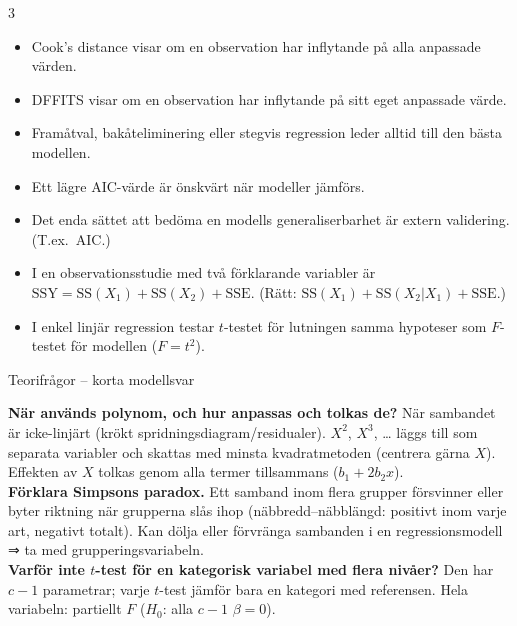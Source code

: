\documentclass[8pt]{extarticle}
\makeatletter
\newcounter{sect}
\newcommand{\sect}[3][hd]{\par\vspace{1.5pt}\refstepcounter{sect}\noindent
  {\setlength{\fboxsep}{1.8pt}\colorbox{#1}{\parbox{\dimexpr\linewidth-2\fboxsep}{\color{white}\sffamily\bfseries
  \strut\thesect\enspace #2}}}\label{#3}\par\nobreak\vspace{0.8pt}\@afterheading}
\newcommand{\sant}{\textcolor{OliveGreen}{\sffamily\bfseries S}}
\newcommand{\falskt}{\textcolor{BrickRed}{\sffamily\bfseries F}}
\newcommand{\SSE}{\mathrm{SSE}}
\newcommand{\SSY}{\mathrm{SSY}}
\newcommand{\SSq}{\mathrm{SS}}
\makeatother
\begin{document}
\begin{multicols*}{3}
{\begin{itemize}[leftmargin=7pt,labelsep=2pt]
\item[\sant] Cook's distance visar om en observation har inflytande på alla anpassade värden.
\item[\sant] DFFITS visar om en observation har inflytande på sitt eget anpassade värde.
\item[\falskt] Framåtval, bakåteliminering eller stegvis regression leder alltid till den bästa modellen.
\item[\sant] Ett lägre AIC-värde är önskvärt när modeller jämförs.
\item[\falskt] Det enda sättet att bedöma en modells generaliserbarhet är extern validering. (T.ex.\ AIC.)
\item[\falskt] I en observationsstudie med två förklarande variabler är $\SSY=\SSq(X_1)+\SSq(X_2)+\SSE$. (Rätt: $\SSq(X_1)+\SSq(X_2|X_1)+\SSE$.)
\item[\sant] I enkel linjär regression testar $t$-testet för lutningen samma hypoteser som $F$-testet för modellen ($F=t^2$).
\end{itemize}}

\sect[cTenta]{Teorifrågor – korta modellsvar}{sec:teorisvar}
\textbf{När används polynom, och hur anpassas och tolkas de?} När sambandet är icke-linjärt (krökt spridningsdiagram/residualer). $X^2$, $X^3$, … läggs till som separata variabler och skattas med minsta kvadratmetoden (centrera gärna $X$). Effekten av $X$ tolkas genom alla termer tillsammans ($b_1+2b_2x$).\\
\textbf{Förklara Simpsons paradox.} Ett samband inom flera grupper försvinner eller byter riktning när grupperna slås ihop (näbbredd–näbblängd: positivt inom varje art, negativt totalt). Kan dölja eller förvränga sambanden i en regressionsmodell ⇒ ta med grupperingsvariabeln.\\
\textbf{Varför inte $t$-test för en kategorisk variabel med flera nivåer?} Den har $c-1$ parametrar; varje $t$-test jämför bara en kategori med referensen. Hela variabeln: partiellt $F$ ($H_0$: alla $c-1$ $\beta=0$).


\end{multicols*}
\end{document}
